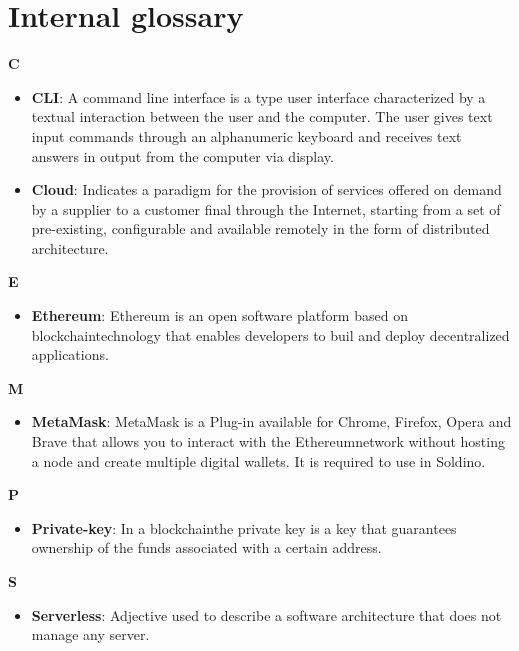 \section{Internal glossary}
\textbf{C}
\begin{itemize}
	\item \textbf{CLI}: A command line interface is a type user interface characterized by a textual interaction between the user and the computer. The user gives text input commands through an alphanumeric keyboard and receives text answers in output from the computer via display.
	\item \textbf{Cloud}: Indicates a paradigm for the provision of services offered on demand by a supplier to a customer
	final through the Internet, starting from a set of pre-existing, configurable and
	available remotely in the form of distributed architecture.
\end{itemize}
\textbf{E}
\begin{itemize}
	\item \textbf{Ethereum}: Ethereum is an open software platform based on blockchain\glo technology that enables developers to buil and deploy decentralized applications.
\end{itemize}
\textbf{M}
\begin{itemize}
	\item \textbf{MetaMask}: MetaMask is a Plug-in available for Chrome, Firefox, Opera and Brave that allows you to interact with the Ethereum\glo network without hosting a node and create multiple digital wallets. It is required to use in Soldino.
\end{itemize}
\textbf{P}
\begin{itemize}
	\item \textbf{Private-key}: In a blockchain\glo the private key is a key that guarantees ownership of the funds associated with
	a certain address.
\end{itemize}
\textbf{S}
\begin{itemize}
	\item \textbf{Serverless}: Adjective used to describe a software architecture that does not manage any server.
\end{itemize}
